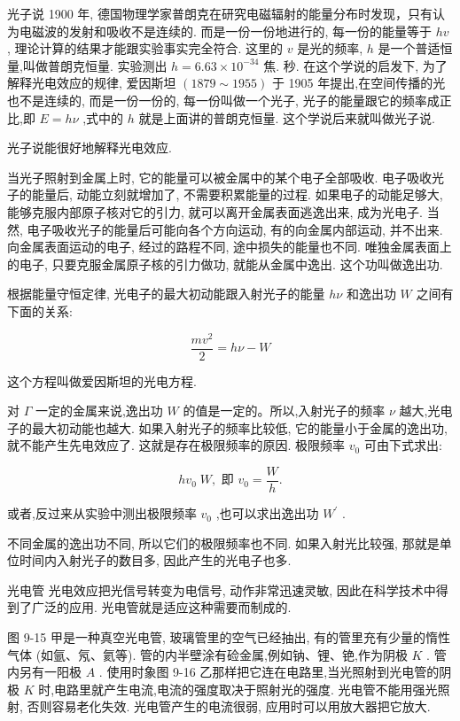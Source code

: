 \documentclass[10pt]{article}
\begin{document}
光子说 1900 年, 德国物理学家普朗克在研究电磁辐射的能量分布时发现，只有认为电磁波的发射和吸收不是连续的. 而是一份一份地进行的, 每一份的能量等于 \({hv}\) , 理论计算的结果才能跟实验事实完全符合. 这里的 \(v\) 是光的频率, \(h\) 是一个普适恒量,叫做普朗克恒量. 实验测出 \(h = {6.63} \times {10}^{-{34}}\) 焦. 秒. 在这个学说的启发下, 为了解释光电效应的规律, 爱因斯坦 \(\left( {{1879} \sim {1955}}\right)\) 于 1905 年提出,在空间传播的光也不是连续的, 而是一份一份的, 每一份叫做一个光子, 光子的能量跟它的频率成正比,即 \(E = {h\nu }\) ,式中的 \(h\) 就是上面讲的普朗克恒量. 这个学说后来就叫做光子说.

光子说能很好地解释光电效应.

当光子照射到金属上时, 它的能量可以被金属中的某个电子全部吸收. 电子吸收光子的能量后, 动能立刻就增加了, 不需要积累能量的过程. 如果电子的动能足够大, 能够克服内部原子核对它的引力, 就可以离开金属表面逃逸出来, 成为光电子. 当然, 电子吸收光子的能量后可能向各个方向运动, 有的向金属内部运动, 并不出来. 向金属表面运动的电子, 经过的路程不同, 途中损失的能量也不同. 唯独金属表面上的电子, 只要克服金属原子核的引力做功, 就能从金属中逸出. 这个功叫做逸出功.

根据能量守恒定律, 光电子的最大初动能跟入射光子的能量 \({h\nu }\) 和逸出功 \(W\) 之间有下面的关系:

\[
\frac{m{v}^{2}}{2} = {h\nu } - W
\]

这个方程叫做爱因斯坦的光电方程.

对 \(\Gamma\) 一定的金属来说,逸出功 \(W\) 的值是一定的。所以,入射光子的频率 \(\nu\) 越大,光电子的最大初动能也越大. 如果入射光子的频率比较低, 它的能量小于金属的逸出功, 就不能产生先电效应了. 这就是存在极限频率的原因. 极限频率 \({v}_{0}\) 可由下式求出:

\[
h{v}_{0}\;W,\text{ 即 }{v}_{0} = \frac{W}{h}.
\]

或者,反过来从实验中测出极限频率 \({v}_{0}\) ,也可以求出逸出功 \({W}^{\prime }\) .

不同金属的逸出功不同, 所以它们的极限频率也不同. 如果入射光比较强, 那就是单位时间内入射光子的数目多, 因此产生的光电子也多.

光电管 光电效应把光信号转变为电信号, 动作非常迅速灵敏, 因此在科学技术中得到了广泛的应用. 光电管就是适应这种需要而制成的.

图 9-15 甲是一种真空光电管, 玻璃管里的空气已经抽出, 有的管里充有少量的惰性气体 (如氩、氖、氦等). 管的内半壁涂有硷金属,例如钠、锂、铯,作为阴极 \(K\) . 管内另有一阳极 \(A\) . 使用时象图 9-16 乙那样把它连在电路里,当光照射到光电管的阴极 \(K\) 时,电路里就产生电流,电流的强度取决于照射光的强度. 光电管不能用强光照射, 否则容易老化失效. 光电管产生的电流很弱, 应用时可以用放大器把它放大.
\end{document}
